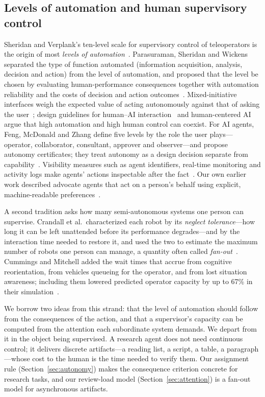 \subsection{Levels of automation and human supervisory control}
\label{sec:rw-loa}

Sheridan and Verplank's ten-level scale for supervisory control of teleoperators is the
origin of most \textit{levels of automation}~\cite{sheridan1978human}. Parasuraman,
Sheridan and Wickens separated the type of function automated (information acquisition,
analysis, decision and action) from the level of automation, and proposed that the level
be chosen by evaluating human-performance consequences together with automation
reliability and the costs of decision and action outcomes~\cite{parasuraman2000model}.
Mixed-initiative interfaces weigh the expected value of acting autonomously against that
of asking the user~\cite{horvitz1999principles}; design guidelines for human--AI
interaction~\cite{amershi2019guidelines} and human-centered AI~\cite{shneiderman2020hcai}
argue that high automation and high human control can coexist. For AI agents, Feng,
McDonald and Zhang define five levels by the role the user plays---operator,
collaborator, consultant, approver and observer---and propose autonomy certificates;
they treat autonomy as a design decision separate from capability~\cite{feng2025levels}.
Visibility measures such as agent identifiers, real-time monitoring and activity logs
make agents' actions inspectable after the fact~\cite{chan2024visibility}. Our own
earlier work described advocate agents that act on a person's behalf using explicit,
machine-readable preferences~\cite{ketter2008advocate}.

A second tradition asks how many semi-autonomous systems one person can supervise.
Crandall et al.\ characterized each robot by its \textit{neglect tolerance}---how long
it can be left unattended before its performance degrades---and by the interaction time
needed to restore it, and used the two to estimate the maximum number of robots one
person can manage, a quantity often called \textit{fan-out}~\cite{crandall2005validating}.
Cummings and Mitchell added the wait times that accrue from cognitive reorientation,
from vehicles queueing for the operator, and from lost situation awareness; including
them lowered predicted operator capacity by up to 67\% in their
simulation~\cite{cummings2008predicting}.

We borrow two ideas from this strand: that the level of automation should follow from the
consequences of the action, and that a supervisor's capacity can be computed from the
attention each subordinate system demands. We depart from it in the object being
supervised. A research agent does not need continuous control; it delivers discrete
artifacts---a reading list, a script, a table, a paragraph---whose cost to the human is
the time needed to verify them. Our assignment rule (Section~\ref{sec:autonomy}) makes the
consequence criterion concrete for research tasks, and our review-load model
(Section~\ref{sec:attention}) is a fan-out model for asynchronous artifacts.

